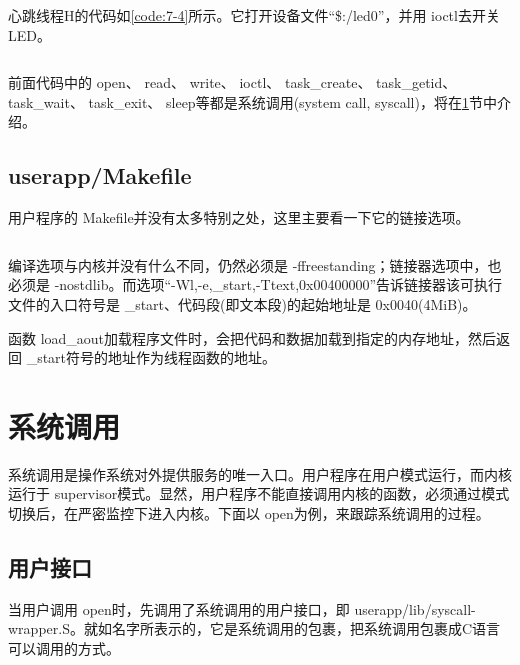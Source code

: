 \documentclass[main.tex]{subfiles}
\begin{document}
\begin{CJK*}{UTF8}{song}
\par
心跳线程H的代码如\ref{code:7-4}所示。它打开设备文件“\$:/led0”，并用 ioctl去开关 LED。

\begin{code}
\label{code:7-4}
\inputminted[firstline=35,lastline=50,linenos,numbersep=5pt,frame=lines,framesep=2mm]{c}{src/chapter07/userapp/main.c}
\end{code}

前面代码中的 open、 read、 write、 ioctl、 task\_\-create、 task\_\-getid、 task\_\-wait、 task\_\-exit、 sleep等都是系统调用(system call, syscall)，将在\ref{7-syscall}节中介绍。

\subsection{userapp/Makefile}
用户程序的 Makefile并没有太多特别之处，这里主要看一下它的链接选项。

\begin{code}
\label{code:7-5}
\inputminted[firstline=31,lastline=42,linenos,numbersep=5pt,frame=lines,framesep=2mm]{make}{src/chapter07/userapp/Makefile}
\end{code}

编译选项与内核并没有什么不同，仍然必须是 -ffree\-standing；链接器选项中，也必须是 -nostdlib。而选项“-Wl,-e,\_start,-Ttext,0x00400000”告诉链接器该可执行文件的入口符号是 \_start、代码段(即文本段)的起始地址是 0x0040(4MiB)。

\par
函数 load\_\-aout加载程序文件时，会把代码和数据加载到指定的内存地址，然后返回 \_start符号的地址作为线程函数的地址。

\section{系统调用}\label{7-syscall}
系统调用是操作系统对外提供服务的唯一入口。用户程序在用户模式运行，而内核运行于 supervisor模式。显然，用户程序不能直接调用内核的函数，必须通过模式切换后，在严密监控下进入内核。下面以 open为例，来跟踪系统调用的过程。

\subsection{用户接口}
当用户调用 open时，先调用了系统调用的用户接口，即 userapp/lib/syscall-wrapper.S。就如名字所表示的，它是系统调用的包裹，把系统调用包裹成C语言可以调用的方式。


\end{CJK*}
\end{document}
